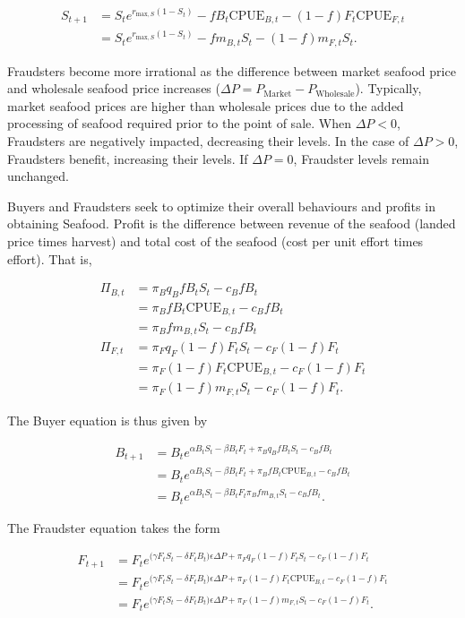 \documentclass[12pt]{article}
\begin{document}
\begin{align}
S_{t+1} &= S_te^{r_{\mathrm{max}, S}(1 - S_t)} - fB_t\mathrm{CPUE}_{B, t} - (1 - f)F_t\textrm{CPUE}_{F, t} \\
&= S_te^{r_{\mathrm{max}, S}(1 - S_t)} - fm_{B, t}S_t - (1 - f)m_{F, t}S_t.
\end{align}

Fraudsters become more irrational as the difference between market seafood price and wholesale seafood price increases ($\Delta P = P_{\textrm{Market}} - P_{\textrm{Wholesale}}$). Typically, market seafood prices are higher than wholesale prices due to the added processing of seafood required prior to the point of sale. When $\Delta P < 0$, Fraudsters are negatively impacted, decreasing their levels. In the case of $\Delta P > 0$, Fraudsters benefit, increasing their levels. If $\Delta P = 0$, Fraudster levels remain unchanged.

Buyers and Fraudsters seek to optimize their overall behaviours and profits in obtaining Seafood. Profit is the difference between revenue of the seafood (landed price times harvest) and total cost of the seafood (cost per unit effort times effort). That is,

\begin{align}
\Pi_{B, t} &= \pi_B q_{B}f B_tS_t - c_B f B_t \\
&= \pi_B f B_t \mathrm{CPUE}_{B, t} - c_B f B_t \\
&= \pi_B fm_{B, t}S_t  - c_B  f B_t \\
\Pi_{F, t} &= \pi_F q_{F}(1 - f) F_tS_t - c_F (1 -f) F_t \\
&= \pi_F (1 - f) F_t \mathrm{CPUE}_{B, t} - c_F  (1 - f) F_t \\
&= \pi_F (1 - f) m_{F, t}S_t  - c_F (1 - f) F_t .
\end{align}

The Buyer equation is thus given by

\begin{align}
B_{t+1} &= B_te^{\alpha B_t S_t - \beta B_t F_t + \pi_B q_{B}f B_tS_t - c_B f B_t} \\
&= B_te^{\alpha B_t S_t - \beta B_t F_t + \pi_B f B_t \mathrm{CPUE}_{B, t} - c_B f B_t} \\ 
&= B_te^{\alpha B_t S_t - \beta B_t F_t \pi_B fm_{B, t}S_t  - c_B  f B_t}.
\end{align}

The Fraudster equation takes the form

\begin{align}
F_{t+1} &= F_te^{\big(\gamma F_t S_t - \delta F_t B_t\big)\epsilon\Delta P + \pi_F q_{F}(1 - f) F_tS_t - c_F (1 - f) F_t}  \\
&= F_te^{\big(\gamma F_t S_t - \delta F_t B_t\big)\epsilon\Delta P + \pi_F (1 - f) F_t \mathrm{CPUE}_{B, t} - c_F (1 - f) F_t} \\
&= F_te^{\big(\gamma F_t S_t - \delta F_t B_t\big)\epsilon\Delta P + \pi_F (1 - f) m_{F, t} S_t  - c_F (1 - f) F_t}.
\end{align}
\end{document}
